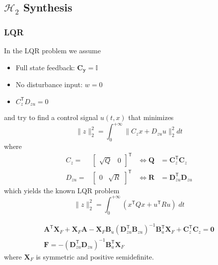 \subsection{\texorpdfstring{$\mathcal{H}_2$}{H2} Synthesis}
\subsubsection{LQR}
In the LQR problem we assume
\begin{itemize}
    \item Full state feedback: $\mathbf{C_y}=\mathbf{\mathbb{I}}$
    \item No disturbance input: $w=0$
    \item $C_z^{\mathsf{T}}D_{zu}=0$
\end{itemize}
and try to find a control signal $u(t,x)$ that minimizes
\begin{equation*}
    \|z\|_2^2=\int_0^{+\infty}\|C_z x+D_{zu}u\|_2^2 dt
\end{equation*}
where
\begin{align*}
    C_z=                       &
    \begin{bmatrix}
        \sqrt{Q} & 0
    \end{bmatrix}^{\mathsf{T}} & \Leftrightarrow \mathbf{Q} & = \mathbf{C}_z^{\mathsf{T}}\mathbf{C}_z       \\
    D_{zu}=                    &
    \begin{bmatrix}
        0 & \sqrt{R}
    \end{bmatrix}^{\mathsf{T}} & \Leftrightarrow \mathbf{R} & = \mathbf{D}_{zu}^{\mathsf{T}}\mathbf{D}_{zu}
\end{align*}
which yields the known LQR problem
\begin{equation*}
    \|z\|_2^2=\int_0^{+\infty}(x^{\mathsf{T}}Qx+u^{\mathsf{T}}Ru)\;dt
\end{equation*}

\noindent\begin{gather*}
    \mathbf{A}^{\mathsf{T}}\mathbf{X}_F + \mathbf{X}_F \mathbf{A} - \mathbf{X}_F \mathbf{B}_u{\left(\mathbf{D}_{zu}^{\mathsf{T}}\mathbf{B}_{zu}\right)}^{-1} \mathbf{B}_u^{\mathsf{T}} \mathbf{X}_F + \mathbf{C}_z^{\mathsf{T}}\mathbf{C}_z = \mathbf{0}\\
    \mathbf{F} = -{\left(\mathbf{D}_{zu}^{\mathsf{T}}\mathbf{D}_{zu}\right)}^{-1} \mathbf{B}_u^{\mathsf{T}}\mathbf{X}_F
\end{gather*}
where $\mathbf{X}_F$ is symmetric and positive semidefinite.

